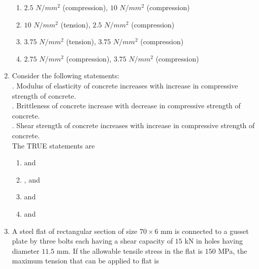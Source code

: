 \documentclass[journal,12pt,onecolumn]{IEEEtran}
\theoremstyle{remark}
\begin{document}
\begin{enumerate}[start=35]
		    \begin{enumerate}
			    \item $2.5$ $N/mm^2$ (compression), $10$ $N/mm^2$ (compression)
			    \item $10$ $N/mm^2$ (tension), $2.5$ $N/mm^2$ (compression)
			    \item $3.75$ $N/mm^2$ (tension), $3.75$ $N/mm^2$ (compression)
			    \item $2.75$ $N/mm^2$ (compression), $3.75$ $N/mm^2$ (compression)\\
		    \end{enumerate}

        \item Consider the following statements:\\
	\uppercase\expandafter{}. Modulus of elasticity of concrete increases with increase in compressive strength of concrete.\\
	\uppercase\expandafter{}. Brittleness of concrete increase with decrease in compressive strength of concrete.\\
	\uppercase\expandafter{}. Shear strength of concrete increases with increase in compressive strength of concrete.\\
	The TRUE statements are
	\begin{enumerate}
		\item \uppercase\expandafter{} and \uppercase\expandafter{}
		\item \uppercase\expandafter{},\uppercase\expandafter{} and \uppercase\expandafter{}
		\item \uppercase\expandafter{} and \uppercase\expandafter{}
		\item \uppercase\expandafter{} and \uppercase\expandafter{}\\
	\end{enumerate}
          \item A steel flat of rectangular section of size $70\times6$ mm is connected to a gusset plate by three bolts each having a shear capacity of $15$ kN in holes having diameter $11.5$ mm. If the allowable tensile stress in the flat is $150$ MPa, the maximum tension that can be applied to flat is\\
\begin{figure}[H]
    \centering
\end{figure}


\end{enumerate}
\end{document}

